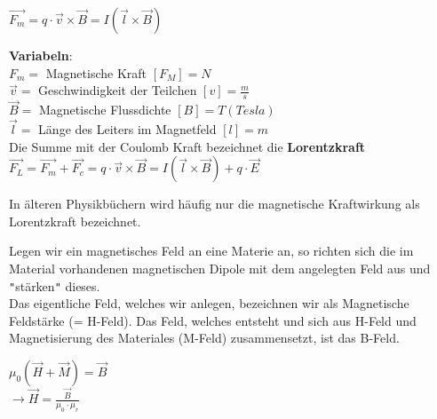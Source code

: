 	\formulaBegin
	$\vec{F_m} = q \cdot \vec{v} \times \vec{B} = I(\vec{l} \times \vec{B})$
	\formulaEnd

	\textbf{Variabeln}: \\
	$ F_m = $ Magnetische Kraft $ [F_M] = N$ \\
	$ \vec{v} = $ Geschwindigkeit der Teilchen $ [v] = \frac{m}{s}$ \\
	$ \vec{B} = $ Magnetische Flussdichte $ [B] = T (Tesla)$ \\
	$ \vec{l} = $ Länge des Leiters im Magnetfeld $ [l] = m $\\

	Die Summe mit der Coulomb Kraft bezeichnet die \textbf{Lorentzkraft} \\

		\formulaBegin
		$\vec{F_L} = \vec{F_m} + \vec{F_c} = q \cdot \vec{v} \times \vec{B} = I(\vec{l} \times \vec{B}) + q \cdot \vec{E} $
		\formulaEnd

		In älteren Physikbüchern wird häufig nur die magnetische Kraftwirkung als Lorentzkraft bezeichnet.

	\iend

\newpage
	\beginip
	Legen wir ein magnetisches Feld an eine Materie an, so richten sich die im Material vorhandenen magnetischen Dipole mit dem angelegten Feld aus und \texttt{"}stärken\texttt{"} dieses. \\
	Das eigentliche Feld, welches wir anlegen, bezeichnen wir als Magnetische Feldstärke (= H-Feld). Das Feld, welches entsteht und sich aus H-Feld und Magnetisierung des Materiales (M-Feld) zusammensetzt, ist das B-Feld.

	\formulaBegin
	$\displaystyle \mu_0 ( \vec{H} + \vec{M})  =  \vec{B} $\\
	$\rightarrow \vec{H} = \frac{\vec{B}}{\mu_0\cdot \mu_r}
$
	\formulaEnd

	\begin{center}
	\end{center}
	\iend

